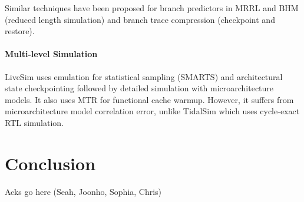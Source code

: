 \documentclass[sigplan,nonacm,10pt]{acmart}
\begin{document}
Similar techniques have been proposed for branch predictors in MRRL and BHM \cite{kluyskens2007branch} (reduced length simulation) and branch trace compression \cite{barr2006branch} (checkpoint and restore).

\paragraph{Multi-level Simulation} LiveSim \cite{hassani2016livesim} uses emulation for statistical sampling (SMARTS) and architectural state checkpointing followed by detailed simulation with microarchitecture models. It also uses MTR for functional cache warmup. However, it suffers from microarchitecture model correlation error, unlike TidalSim which uses cycle-exact RTL simulation.

\section{Conclusion}


\begin{acks}
Acks go here (Seah, Joonho, Sophia, Chris)
\end{acks}




\end{document}
